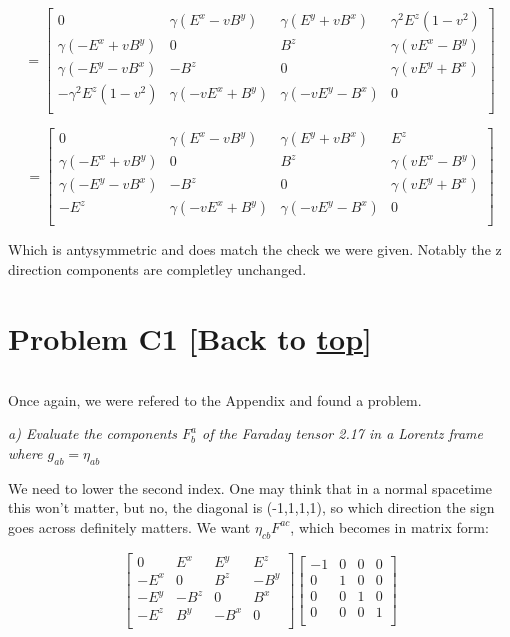 \documentclass[landscape,letterpaper,10pt,english]{article}
\begin{document}
    \[ = \begin{bmatrix}
0 & \gamma (E^x - vB^y) & \gamma(E^y + vB^x) & \gamma^2 E^z (1-v^2) \\
\gamma(-E^x+vB^y) & 0 & B^z & \gamma(vE^x - B^y) \\
\gamma(-E^y - vB^x) & -B^z & 0 & \gamma(vE^y + B^x)\\
-\gamma^2 E^z (1-v^2) & \gamma(-vE^x + B^y) & \gamma(-vE^y - B^x) & 0 \\
\end{bmatrix}\]

\[ = \begin{bmatrix}
0 & \gamma (E^x - vB^y) & \gamma(E^y + vB^x) & E^z \\
\gamma(-E^x+vB^y) & 0 & B^z & \gamma(vE^x - B^y) \\
\gamma(-E^y - vB^x) & -B^z & 0 & \gamma(vE^y + B^x)\\
-E^z & \gamma(-vE^x + B^y) & \gamma(-vE^y - B^x) & 0 \\
\end{bmatrix}\]

    Which is antysymmetric and does match the check we were given. Notably
the z direction components are completley unchanged.

    \hypertarget{problem-c1-back-to-top}{%
\section{\texorpdfstring{Problem C1 {[}Back to
\hyperref[toc]{top}{]}}{Problem C1 {[}Back to {]}}}\label{problem-c1-back-to-top}}

\[\label{C1}\]

Once again, we were refered to the Appendix and found a problem.

\emph{a) Evaluate the components \(F^a_b\) of the Faraday tensor 2.17 in
a Lorentz frame where \(g_{ab} = \eta_{ab}\)}

    We need to lower the second index. One may think that in a normal
spacetime this won't matter, but no, the diagonal is (-1,1,1,1), so
which direction the sign goes across definitely matters. We want
\(\eta_{cb} F^{ac}\), which becomes in matrix form:

\[ \begin{bmatrix}
0 & E^x & E^y & E^z \\
-E^x & 0 & B^z & -B^y \\
-E^y & -B^z & 0 & B^x \\
-E^z & B^y & -B^x & 0 \\
\end{bmatrix}\begin{bmatrix}
-1 & 0 & 0 & 0 \\
0 & 1 & 0 & 0 \\
0 & 0 & 1 & 0 \\
0 & 0 & 0 & 1 \\
\end{bmatrix}\]
\end{document}
